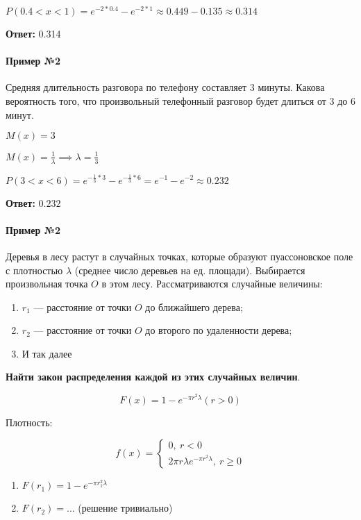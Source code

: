 \documentclass{article}
\begin{document}
$P(0.4 < x < 1) = e^{-2 * 0.4} - e^{-2 * 1} \approx 0.449 - 0.135 \approx 0.314$

\textbf{Ответ:} 0.314

\paragraph{Пример №2}

Средняя длительность разговора по телефону составляет 3 минуты. Какова вероятность того, что произвольный телефонный разговор будет длиться от 3 до 6 минут.

$M(x) = 3$

$M(x) = \frac{1}{\lambda} \implies \lambda = \frac{1}{3}$

$P(3 < x < 6) = e^{-\frac{1}{3} * 3} - e^{-\frac{1}{3} * 6} = e^{-1} - e^{-2} \approx 0.232$

\textbf{Ответ:} $0.232$

\paragraph{Пример №2} Деревья в лесу растут в случайных точках, которые образуют пуассоновское поле с плотностью $\lambda$ (среднее число деревьев на ед. площади). Выбирается произвольная точка $O$ в этом лесу. Рассматриваются случайные величины: 

\begin{enumerate}
    \item $r_1$ — расстояние от точки $O$ до ближайшего дерева;
    \item $r_2$ — расстояние от точки $O$ до второго по удаленности дерева;
    \item И так далее
\end{enumerate}

\textbf{Найти закон распределения каждой из этих случайных величин}.

$$F(x) = 1 - e^{-\pi r^2 \lambda} (r > 0)$$

Плотность:

$$f(x) = \begin{cases}
    0, \ r < 0 \\
    2 \pi r \lambda e^{- \pi r^2 \lambda}, \ r \ge 0
\end{cases}$$

\begin{enumerate}
    \item $F(r_1) = 1 - e^{- \pi r_1^2 \lambda}$
    \item $F(r_2) = \dots$ (решение тривиально)
\end{enumerate}
\end{document}
